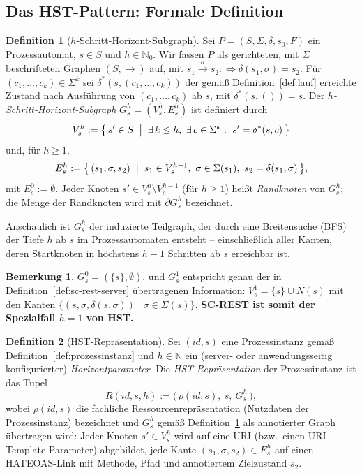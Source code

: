 ﻿\documentclass[a4paper,12pt]{article}
\theoremstyle{definition}
\newtheorem{definition}{Definition}
\newtheorem{bemerkung}{Bemerkung}
\begin{document}
\subsection{Das HST-Pattern: Formale Definition}
\label{sec:hst-definition}

\begin{definition}[$h$-Schritt-Horizont-Subgraph]
	\label{def:horizont-subgraph}
	Sei $P=(S,\Sigma,\delta,s_0,F)$ ein Prozessautomat, $s\in S$ und $h\in\mathbb{N}_0$.
	Wir fassen $P$ als gerichteten, mit $\Sigma$ beschrifteten Graphen $(S,\to)$ auf, mit
	$s_1\xrightarrow{\sigma}s_2 :\Leftrightarrow \delta(s_1,\sigma)=s_2$. Für
	$(c_1,\ldots,c_k)\in\Sigma^k$ sei $\delta^{*}(s,(c_1,\ldots,c_k))$ der gemäß
	Definition~\ref{def:lauf} erreichte Zustand nach Ausführung von
	$(c_1,\ldots,c_k)$ ab $s$, mit $\delta^{*}(s,())=s$. Der \emph{$h$-Schritt-Horizont-Subgraph}
	$G_s^h=(V_s^h,E_s^h)$ ist definiert durch
	\[
		V_s^h := \bigl\{\, s' \in S \;\bigm|\; \exists\, k\le h,\ \exists\, c\in\Sigma^k:\
		s'=\delta^{*}(s,c) \,\bigr\}
	\]
	und, für $h\ge1$,
	\[
		E_s^h := \bigl\{\, (s_1,\sigma,s_2) \;\bigm|\; s_1\in V_s^{h-1},\ \sigma\in\Sigma(s_1),\
		s_2=\delta(s_1,\sigma) \,\bigr\},
	\]
	mit $E_s^0:=\emptyset$. Jeder Knoten $s'\in V_s^h\setminus V_s^{h-1}$ (für $h\ge1$)
	heißt \emph{Randknoten} von $G_s^h$; die Menge der Randknoten wird mit $\partial
	G_s^h$ bezeichnet.
\end{definition}

Anschaulich ist $G_s^h$ der induzierte Teilgraph, der durch eine Breitensuche (BFS) der
Tiefe $h$ ab $s$ im Prozessautomaten entsteht -- einschließlich aller Kanten, deren
Startknoten in höchstens $h-1$ Schritten ab $s$ erreichbar ist.

\begin{bemerkung}
	\label{bem:sc-rest-spezialfall}
	$G_s^0=(\{s\},\emptyset)$, und $G_s^1$ entspricht genau der in
	Definition~\ref{def:sc-rest-server} übertragenen Information: $V_s^1=\{s\}\cup N(s)$
	mit den Kanten $\{(s,\sigma,\delta(s,\sigma))\mid \sigma\in\Sigma(s)\}$. \textbf{SC-REST
	ist somit der Spezialfall $h=1$ von HST.}
\end{bemerkung}

\begin{definition}[HST-Repräsentation]
	\label{def:hst-repraesentation}
	Sei $(id,s)$ eine Prozessinstanz gemäß Definition~\ref{def:prozessinstanz} und
	$h\in\mathbb{N}$ ein (server- oder anwendungsseitig konfigurierter)
	\emph{Horizontparameter}. Die \emph{HST-Repräsentation} der Prozessinstanz ist das
	Tupel
	\[
		R(id,s,h) := \bigl(\, \rho(id,s),\ s,\ G_s^h \,\bigr),
	\]
	wobei $\rho(id,s)$ die fachliche Ressourcenrepräsentation (Nutzdaten der
	Prozessinstanz) bezeichnet und $G_s^h$ gemäß Definition~\ref{def:horizont-subgraph}
	als annotierter Graph übertragen wird: Jeder Knoten $s'\in V_s^h$ wird auf eine URI
	(bzw.\ einen URI-Template-Parameter) abgebildet, jede Kante $(s_1,\sigma,s_2)\in
	E_s^h$ auf einen HATEOAS-Link mit Methode, Pfad und annotiertem Zielzustand $s_2$.
\end{definition}
\end{document}
